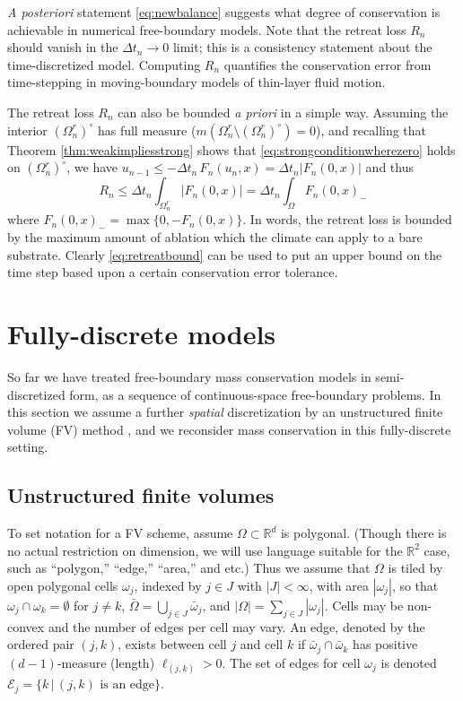 \documentclass[final,onefignum]{siamart190516}
\newcommand\RR{\mathbb{R}}
\begin{document}
\emph{A posteriori} statement \eqref{eq:newbalance} suggests what degree of conservation is achievable in numerical free-boundary models.  Note that the retreat loss $R_n$ should vanish in the $\Delta t_n\to 0$ limit; this is a consistency statement about the time-discretized model.  Computing $R_n$ quantifies the conservation error from time-stepping in moving-boundary models of thin-layer fluid motion.

The retreat loss $R_n$ can also be bounded \emph{a priori} in a simple way.  Assuming the interior $(\Omega_n^r)^\circ$ has full measure ($m(\Omega_n^r \setminus (\Omega_n^r)^\circ)=0$), and recalling that Theorem \ref{thm:weakimpliesstrong} shows that \eqref{eq:strongconditionwherezero} holds on $(\Omega_n^r)^\circ$, we have $u_{n-1} \le -\Delta t_n\,F_n(u_n,x) = \Delta t_n |F_n(0,x)|$ and thus
\begin{equation}
R_n \le \Delta t_n \int_{\Omega_n^r} |F_n(0,x)| = \Delta t_n \int_\Omega F_n(0,x)_- \label{eq:retreatbound}
\end{equation}
where $F_n(0,x)_- = \max\{0,-F_n(0,x)\}$.  In words, the retreat loss is bounded by the maximum amount of ablation which the climate can apply to a bare substrate.  Clearly \eqref{eq:retreatbound} can be used to put an upper bound on the time step based upon a certain conservation error tolerance.


\section{Fully-discrete models}  \label{sec:spacediscretized}

So far we have treated free-boundary mass conservation models in semi-discretized form, as a sequence of continuous-space free-boundary problems.  In this section we assume a further \emph{spatial} discretization by an unstructured finite volume (FV) method \cite{LeVeque2002}, and we reconsider mass conservation in this fully-discrete setting.

\subsection{Unstructured finite volumes} \label{subsec:spacenotation}  To set notation for a FV scheme, assume $\Omega \subset \RR^d$ is polygonal.  (Though there is no actual restriction on dimension, we will use language suitable for the $\RR^2$ case, such as ``polygon,'' ``edge,'' ``area,'' and etc.)  Thus we assume that $\Omega$ is tiled by open polygonal cells $\omega_j$, indexed by $j\in J$ with $|J|<\infty$, with area $|\omega_j|$, so that $\omega_j \cap \omega_k = \emptyset$ for $j\ne k$, $\bar\Omega = \bigcup_{j\in J} \bar \omega_j$, and $|\Omega| = \sum_{j\in J} |\omega_j|$.  Cells may be non-convex and the number of edges per cell may vary.  An edge, denoted by the ordered pair $(j,k)$, exists between cell $j$ and cell $k$ if $\bar\omega_j \cap \bar \omega_k$ has positive $(d-1)$-measure (length) $\ell_{(j,k)}>0$.  The set of edges for cell $\omega_j$ is denoted $\mathcal{E}_j=\{k\,\big|\,(j,k) \text{ is an edge}\}$.
\end{document}
